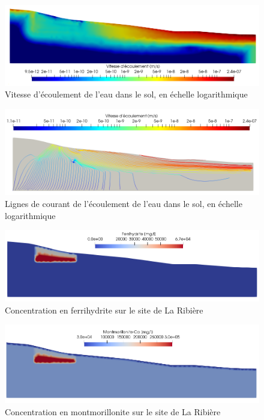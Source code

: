 \documentclass{article}
\begin{document}
\begin{figure}[H]
    \centering
    \includegraphics[width=\linewidth]{LJ-vitesse-ecoulement.PNG}
    \caption{Vitesse d'écoulement de l'eau dans le sol, en échelle logarithmique}
    \label{fig:vitesse_ecoulement}
\end{figure}
\begin{figure}[H]
    \centering
    \includegraphics[width=\linewidth]{LJ-flowrate-lines.PNG}
    \caption{Lignes de courant de l'écoulement de l'eau dans le sol, en échelle logarithmique}
    \label{fig:vitesse_ecoulement_lines}
\end{figure}



\begin{figure}[H]
    \centering
    \includegraphics[width=\linewidth]{LJ-Ferrihydrite-concentration.PNG}
    \caption{Concentration en ferrihydrite sur le site de La Ribière}
    \label{fig:concentration_ferrihydrite}
\end{figure}

\begin{figure}[H]
    \centering
    \includegraphics[width=\linewidth]{LJ-Montmorillonite-concentration.PNG}
    \caption{Concentration en montmorillonite sur le site de La Ribière}
    \label{fig:concentration_montmorillonite}
\end{figure}
\end{document}
